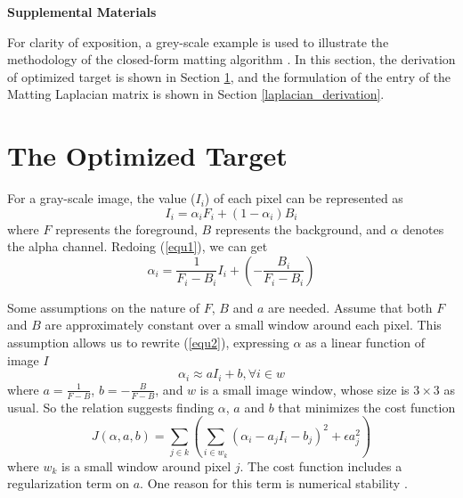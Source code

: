 \documentclass[journal]{IEEEtran}
\begin{document}





\newpage
\begin{center}
\textbf{\large Supplemental Materials}
\end{center}
\setcounter{section}{0}
For clarity of exposition, a grey-scale example is used to illustrate the methodology of the closed-form matting algorithm \cite{levin2007closed}. In this section, the derivation of optimized target is shown in Section \ref{target_derivation}, and the formulation of the entry of the Matting Laplacian matrix is shown in Section \ref{laplacian_derivation}.

\section{The Optimized Target}
\label{target_derivation}
For a gray-scale image, the value ($I_i$) of each pixel can be represented as
\begin{equation}
    I_i = \alpha_{i} F_{i} + (1 - \alpha_{i})B_{i}
    \label{equ1}
\end{equation}
where $F$ represents the foreground, $B$ represents the background, and $\alpha$ denotes the alpha channel. Redoing (\ref{equ1}), we can get
\begin{equation}
    \alpha_{i} = \frac{1}{F_{i} - B_{i}}I_{i} + (-\frac{B_{i}}{F_{i} - B_{i}}) 
    \label{equ2}
\end{equation}

Some assumptions on the nature of $F$, $B$ and $a$ are needed. Assume that both $F$ and $B$ are approximately constant over a small window around  each pixel. This assumption allows us to rewrite (\ref{equ2}), expressing $\alpha$ as a linear function of image $I$
\begin{equation}
    \alpha_{i} \approx aI_{i} + b, \forall i\in w
    \label{equ3}
\end{equation}
where $a = \frac{1}{F-B}$, $b = -\frac{B}{F-B}$, and $w$ is a small image window, whose size is $3\times 3$ as usual. So the relation suggests finding $\alpha$, $a$ and $b$ that minimizes the cost function
\begin{equation}
    J(\alpha, a, b) = \sum\limits_{j\in k}\left(\sum\limits_{i\in w_{k}}(\alpha_{i} - a_{j}I_{i} - b_{j})^{2} + \epsilon a_{j}^{2}\right)
    \label{equ4}
\end{equation}
where $w_k$ is a small window around pixel $j$. The cost function includes a regularization term on $a$. One reason for this term is numerical stability \cite{levin2007closed}.
\end{document}
